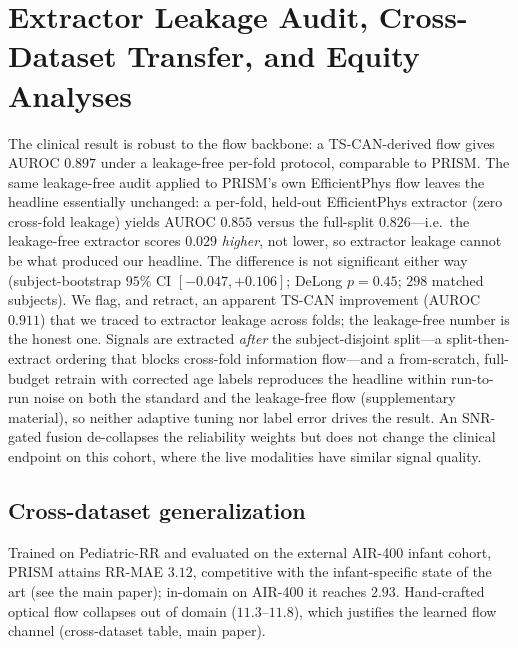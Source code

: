 \section{Extractor Leakage Audit, Cross-Dataset Transfer, and Equity Analyses}
\label{app:robustness}
The clinical result is robust to the flow backbone: a TS-CAN-derived flow gives AUROC $0.897$ under a
leakage-free per-fold protocol, comparable to PRISM. The same leakage-free audit applied to PRISM's own
EfficientPhys flow leaves the headline essentially unchanged: a per-fold, held-out EfficientPhys extractor
(zero cross-fold leakage) yields AUROC $0.855$ versus the full-split $0.826$---i.e.\ the leakage-free
extractor scores $0.029$ \emph{higher}, not lower, so extractor leakage cannot be what produced our
headline. The difference is not significant either way (subject-bootstrap $95\%$ CI $[-0.047,+0.106]$;
DeLong $p=0.45$; $298$ matched subjects).
We flag, and retract, an apparent TS-CAN improvement (AUROC $0.911$) that we traced to extractor leakage
across folds; the leakage-free number is the honest one. Signals are extracted \emph{after} the
subject-disjoint split---a split-then-extract ordering that blocks cross-fold information flow---and a
from-scratch, full-budget retrain with corrected age labels reproduces the headline within run-to-run noise
on both the standard and the leakage-free flow (supplementary material), so neither adaptive tuning nor
label error drives the result. An SNR-gated fusion de-collapses the reliability weights but does not change the clinical endpoint
on this cohort, where the live modalities have similar signal quality.

\subsection{Cross-dataset generalization}
Trained on Pediatric-RR and evaluated on the external AIR-400 infant cohort, PRISM attains RR-MAE $3.12$,
competitive with the infant-specific state of the art (see the main paper); in-domain on AIR-400 it
reaches $2.93$.
Hand-crafted optical flow collapses out of domain ($11.3$--$11.8$), which justifies the learned flow
channel (cross-dataset table, main paper).

